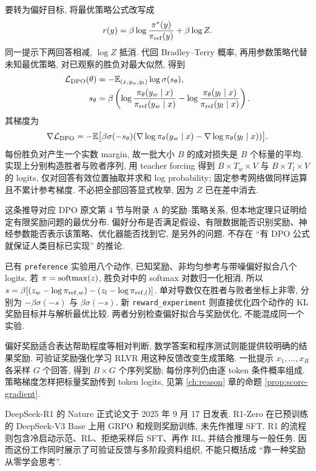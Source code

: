 要转为偏好目标, 将最优策略公式改写成
\[
r(y)=\beta\log\frac{\pi^*(y)}{\pi_{\rm ref}(y)}+\beta\log Z.
\]
同一提示下两回答相减, $\log Z$ 抵消. 代回 Bradley--Terry 概率, 再用参数策略代替未知最优策略, 对已观察的胜负对最大似然, 得到
\begin{align*}
\mathcal L_{\rm DPO}(\theta)&=-\mathbb E_{(x,y_w,y_l)}\log\sigma(s_\theta),\\
s_\theta&=\beta\left(\log\frac{\pi_\theta(y_w\mid x)}{\pi_{\rm ref}(y_w\mid x)}
-\log\frac{\pi_\theta(y_l\mid x)}{\pi_{\rm ref}(y_l\mid x)}\right).
\end{align*}
其梯度为
\[
\nabla\mathcal L_{\rm DPO}
=-\mathbb E\bigl[\beta\sigma(-s_\theta)
(\nabla\log\pi_\theta(y_w\mid x)-\nabla\log\pi_\theta(y_l\mid x))\bigr].
\]
每份胜负对产生一个实数 margin, 故一批大小 $B$ 的成对损失是 $B$ 个标量的平均. 实现上分别构造胜者与败者序列, 用 teacher forcing 得到 $B\times T_w\times V$ 与 $B\times T_l\times V$ 的 logits, 仅对回答有效位置抽取并求和 log probability; 固定参考网络做同样运算且不累计参考梯度. 不必把全部回答显式枚举, 因为 $Z$ 已在差中消去.

这条推导对应 DPO 原文第 4 节与附录 A 的奖励--策略关系\cite{dpo}, 但本地定理只证明给定有限奖励问题的最优分布. 偏好分布是否满足假设、有限数据能否识别奖励、神经参数能否表示该策略、优化器能否找到它, 是另外的问题. 不存在 ``有 DPO 公式就保证人类目标已实现'' 的推论.

已有 \texttt{preference} 实验用八个动作, 已知奖励、非均匀参考与带噪偏好拟合八个 logits. 若 $\pi=\operatorname{softmax}(z)$, 胜负对中的 softmax 对数归一化相消, 所以 $s=\beta[(z_w-\log\pi_{{\rm ref},w})-(z_l-\log\pi_{{\rm ref},l})]$. 单对导数仅在胜者与败者坐标上非零, 分别为 $-\beta\sigma(-s)$ 与 $\beta\sigma(-s)$. 新 \texttt{reward\_experiment} 则直接优化四个动作的 KL 奖励目标并与解析最优比较. 两者分别检查偏好拟合与奖励优化, 不能混成同一个实验.

\label{sec:lm-rlvr}
偏好奖励适合表达帮助程度等相对判断, 数学答案和程序测试则能提供较明确的结果奖励. 可验证奖励强化学习 RLVR 用这种反馈改变生成策略. 一批提示 $x_1,\ldots,x_B$ 各采样 $G$ 个回答, 得到 $B\times G$ 个序列奖励; 每份序列仍由逐 token 条件概率组成. 策略梯度怎样把标量奖励传到 token logits, 见第 \ref{ch:reason} 章的命题 \ref{prop:score-gradient}.

DeepSeek-R1 的 Nature 正式论文于 2025 年 9 月 17 日发表\cite{r1nature}. R1-Zero 在已预训练的 DeepSeek-V3 Base 上用 GRPO 和规则奖励训练, 未先作推理 SFT. R1 的流程则包含冷启动示范、RL、拒绝采样后 SFT、再作 RL, 并结合推理与一般任务. 因而这份工作同时展示了可验证反馈与多阶段资料组织, 不能只概括成 ``靠一种奖励从零学会思考''.

